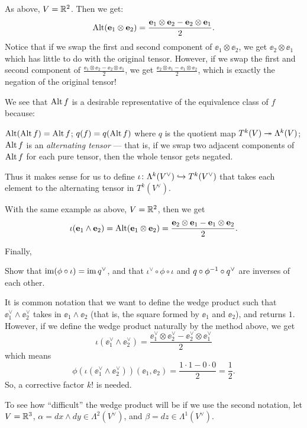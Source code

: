 \begin{example}
	As above, $V = \mathbb R^2$. Then we get:
	\[ \operatorname{Alt} (\mathbf e_1 \otimes \mathbf e_2) = \frac{\mathbf e_1 \otimes \mathbf e_2 - \mathbf e_2 \otimes \mathbf e_1}{2}. \]
	Notice that if we swap the first and second component of $\ee_1 \otimes \ee_2$, we get $\ee_2
	\otimes \ee_1$ which has little to do with the original tensor. However, if we swap
	the first and second component of $\frac{\ee_1 \otimes \ee_2 - \ee_2 \otimes \ee_1}{2}$, we get
	$\frac{\ee_2 \otimes \ee_1 - \ee_1 \otimes \ee_2}{2}$, which is exactly the negation of the
	original tensor!
\end{example}

We see that $\operatorname{Alt} f$ is a desirable representative of the equivalence class of $f$ because:
\begin{itemize}
	\ii $\operatorname{Alt} (\operatorname{Alt} f) = \operatorname{Alt} f$;
	\ii $q(f) = q(\operatorname{Alt} f)$ where $q$ is the quotient map $T^k(V) \twoheadrightarrow \Lambda^k(V)$;
	\ii $\operatorname{Alt} f$ is an \emph{alternating tensor} --- that is, if we swap two adjacent components
	of $\operatorname{Alt} f$ for each pure tensor, then the whole tensor gets negated.
\end{itemize}
Thus it makes sense for us to define $\iota \colon \Lambda^k(V^\vee) \hookrightarrow T^k(V^\vee)$
that takes each element to the alternating tensor in $T^k(V^\vee)$.
\begin{example}
	With the same example as above, $V = \mathbb R^2$, then we get
	\[
		\iota(\mathbf e_1 \wedge \mathbf e_2) = \operatorname{Alt}(\mathbf e_1 \otimes \mathbf e_2)
		= \frac{\mathbf e_2 \otimes \mathbf e_1 - \mathbf e_1 \otimes \mathbf e_2}{2}.
	\]
\end{example}
Finally,
\begin{exercise}
	Show that $\operatorname{im} (\phi \circ \iota) = \operatorname{im} q^\vee$, and that
	$\iota^\vee \circ \phi \circ \iota$ and $q \circ \phi^{-1} \circ q^\vee$
	are inverses of each other.
\end{exercise}

It is common notation that we want to define the wedge product such that
$\ee_1^\vee \wedge \ee_2^\vee$ takes in $\ee_1 \wedge \ee_2$ (that is, the square formed by $\ee_1$
and $\ee_2$), and returns $1$. However, if we define the wedge product naturally by the method
above, we get
\[
	\iota(\ee_1^\vee \wedge \ee_2^\vee)
	= \frac{\ee_1^\vee \otimes \ee_2^\vee - \ee_2^\vee \otimes \ee_1^\vee}{2}
\]
which means
\[
	\phi(\iota(\ee_1^\vee \wedge \ee_2^\vee))(\ee_1, \ee_2)
	= \frac{1 \cdot 1 - 0 \cdot 0}{2} = \frac{1}{2}.
\]
So, a corrective factor $k!$ is needed.

To see how ``difficult'' the wedge product will be if we use the second notation, let $V = \mathbb R^3$,
$\alpha = dx \wedge dy \in \Lambda^2(V^\vee)$, and $\beta = dz \in \Lambda^1(V^\vee)$.

